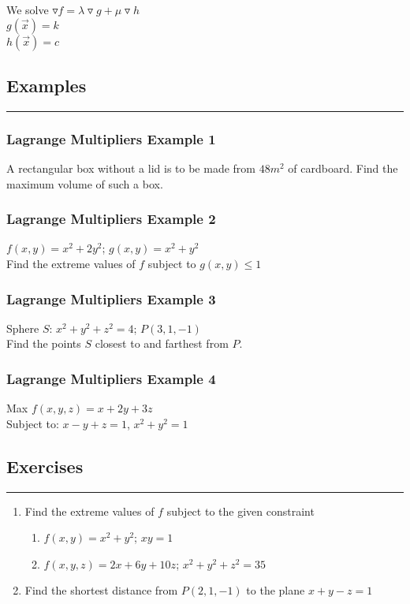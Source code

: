 \documentclass[12pt]{article}
\begin{document}
We solve \(\triangledown f = \lambda \triangledown g + \mu \triangledown h\)\\
\(g(\vec{x} ) = k \)\\
\(h(\vec{x} ) = c \)

\subsection{Examples}
\rule{\textwidth}{0.1mm}
\subsubsection{Lagrange Multipliers Example 1}
A rectangular box without a lid is to be made from \(48m^2\) of cardboard. Find the maximum volume of such a box.

\subsubsection{Lagrange Multipliers Example 2}
\(f(x,y) = x^2 + 2y^2\); \(g(x,y) = x^2 + y^2\) \\ 
Find the extreme values of \(f\) subject to \(g(x,y) \leq 1\) 

\subsubsection{Lagrange Multipliers Example 3}
Sphere \(S\): \(x^2 + y^2 + z^2 = 4\); \(P(3,1,-1)\) \\
Find the points \(S\) closest to and farthest from \(P\). 

\subsubsection{Lagrange Multipliers Example 4}
Max \(f(x,y,z) = x + 2y + 3z\)\\
Subject to: \(x-y+z = 1	\), \(x^2 + y^2 = 1\)

\subsection{Exercises}
\rule{\textwidth}{0.1mm}
\begin{enumerate}
	\item Find the extreme values of \(f\) subject to the given constraint
		\begin{enumerate}
			\item \(f(x,y) = x^2 + y^2\); \(xy = 1\)
			\item \(f(x,y,z) = 2x + 6y + 10z\); \(x^2 + y^2 + z^2 = 35\) 
		\end{enumerate}
	\item Find the shortest distance from \(P(2,1,-1)\) to the plane \(x + y -z = 1\)
\end{enumerate}
\end{document}

